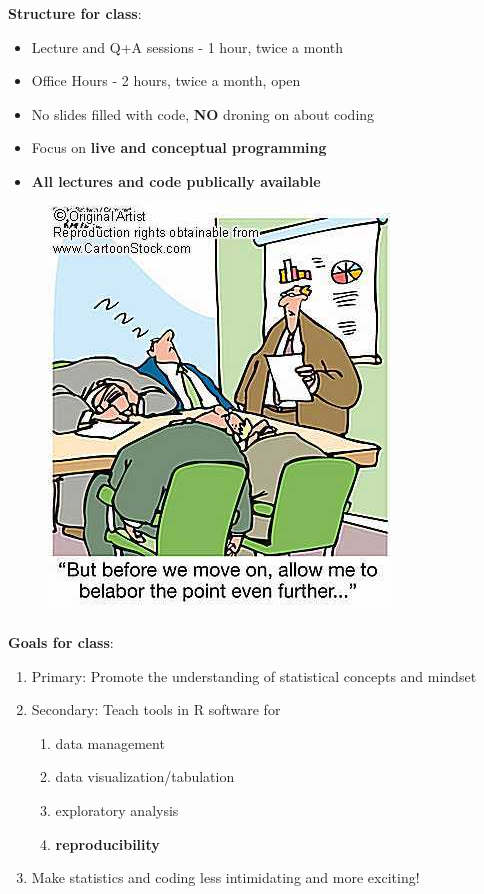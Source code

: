 \documentclass[xcolor=dvipsnames]{beamer}
\begin{document}
\begin{frame}
\frametitle{\insertsectionhead}
\textbf{Structure for class}:
\begin{itemize}
\item Lecture and Q+A sessions - 1 hour, twice a month
\item Office Hours - 2 hours, twice a month, open
\item No slides filled with code, \textbf{NO} droning on about coding
\item Focus on \textbf{live and conceptual programming}
\item \textbf{All lectures and code publically available}
\end{itemize}

\begin{figure}
\includegraphics[scale=1.25]{images/boring-lecture.jpg}
\end{figure}

\end{frame}

\begin{frame}
\frametitle{\insertsectionhead}
\textbf{Goals for class}:
\begin{enumerate}
\item Primary: Promote the understanding of statistical concepts and mindset
\item Secondary: Teach tools in R software for
\begin{enumerate}
\item data management
\item data visualization/tabulation
\item exploratory analysis
\item \textbf{reproducibility}
\end{enumerate}
\item Make statistics and coding less intimidating and more exciting!
\end{enumerate}

\end{frame}
\end{document}
